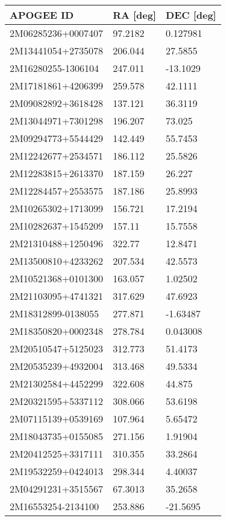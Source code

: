 \documentclass[fleqn,usenatbib]{mnras}
\begin{document}
\begin{table}
\centering
  \begin{tabular}{lll}
  \toprule
  APOGEE ID  &       RA [deg] &       DEC [deg]                                     \\
  \midrule
2M06285236+0007407 &  97.2182 &  0.127981 \\
2M13441054+2735078 &  206.044 &   27.5855 \\
2M16280255-1306104 &  247.011 &  -13.1029 \\
2M17181861+4206399 &  259.578 &   42.1111 \\
2M09082892+3618428 &  137.121 &   36.3119 \\
2M13044971+7301298 &  196.207 &    73.025 \\
2M09294773+5544429 &  142.449 &   55.7453 \\
2M12242677+2534571 &  186.112 &   25.5826 \\
2M12283815+2613370 &  187.159 &    26.227 \\
2M12284457+2553575 &  187.186 &   25.8993 \\
2M10265302+1713099 &  156.721 &   17.2194 \\
2M10282637+1545209 &   157.11 &   15.7558 \\
2M21310488+1250496 &   322.77 &   12.8471 \\
2M13500810+4233262 &  207.534 &   42.5573 \\
2M10521368+0101300 &  163.057 &   1.02502 \\
2M21103095+4741321 &  317.629 &   47.6923 \\
2M18312899-0138055 &  277.871 &  -1.63487 \\
2M18350820+0002348 &  278.784 &  0.043008 \\
2M20510547+5125023 &  312.773 &   51.4173 \\
2M20535239+4932004 &  313.468 &   49.5334 \\
2M21302584+4452299 &  322.608 &    44.875 \\
2M20321595+5337112 &  308.066 &   53.6198 \\
2M07115139+0539169 &  107.964 &   5.65472 \\
2M18043735+0155085 &  271.156 &   1.91904 \\
2M20412525+3317111 &  310.355 &   33.2864 \\
2M19532259+0424013 &  298.344 &   4.40037 \\
2M04291231+3515567 &  67.3013 &   35.2658 \\
2M16553254-2134100 &  253.886 &  -21.5695 \\

\end{tabular}
\end{table}
\end{document}
